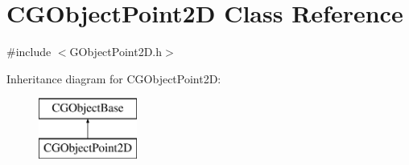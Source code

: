 \hypertarget{class_c_g_object_point2_d}{}\section{C\+G\+Object\+Point2\+D Class Reference}
\label{class_c_g_object_point2_d}


{\ttfamily \#include $<$G\+Object\+Point2\+D.\+h$>$}

Inheritance diagram for C\+G\+Object\+Point2\+D\+:\begin{figure}[H]
\begin{center}
\leavevmode
\includegraphics[height=2.000000cm]{class_c_g_object_point2_d}
\end{center}
\end{figure}

